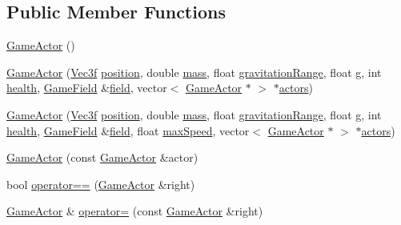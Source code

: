 \subsection*{Public Member Functions}
\begin{DoxyCompactItemize}
\item 
\hyperlink{class_game_actor_a15b04d8c6628c4d004573c3facfdb418}{Game\+Actor} ()
\item 
\hyperlink{class_game_actor_a8419e87ea13e15b82ed1564e477377ac}{Game\+Actor} (\hyperlink{class_vec3f}{Vec3f} \hyperlink{class_game_actor_aefed3c91bf32ad388d86657b3bb9ddfa}{position}, double \hyperlink{class_game_actor_a2111233f4f0216db4d172d5088ebeed4}{mass}, float \hyperlink{class_game_actor_a9c0ba51b08a3e617d9629c0ee8d309f2}{gravitation\+Range}, float \hyperlink{class_game_actor_a42ed4bef0d99cf053ff9a025c86d34d3}{g}, int \hyperlink{class_game_actor_a5d402a953140585fb7cc3f8a3a24a2a4}{health}, \hyperlink{class_game_field}{Game\+Field} \&\hyperlink{class_game_actor_a0224fbc502abd6b7579787aa234332d5}{field}, vector$<$ \hyperlink{class_game_actor}{Game\+Actor} $\ast$ $>$ $\ast$\hyperlink{class_game_actor_a2405618d895f5143b42ae9e94d20e693}{actors})
\item 
\hyperlink{class_game_actor_aad104099e725fa6224de80dbaf52f2b1}{Game\+Actor} (\hyperlink{class_vec3f}{Vec3f} \hyperlink{class_game_actor_aefed3c91bf32ad388d86657b3bb9ddfa}{position}, double \hyperlink{class_game_actor_a2111233f4f0216db4d172d5088ebeed4}{mass}, float \hyperlink{class_game_actor_a9c0ba51b08a3e617d9629c0ee8d309f2}{gravitation\+Range}, float \hyperlink{class_game_actor_a42ed4bef0d99cf053ff9a025c86d34d3}{g}, int \hyperlink{class_game_actor_a5d402a953140585fb7cc3f8a3a24a2a4}{health}, \hyperlink{class_game_field}{Game\+Field} \&\hyperlink{class_game_actor_a0224fbc502abd6b7579787aa234332d5}{field}, float \hyperlink{class_game_actor_a15b6abd006c52b21c569932f8b484eb0}{max\+Speed}, vector$<$ \hyperlink{class_game_actor}{Game\+Actor} $\ast$ $>$ $\ast$\hyperlink{class_game_actor_a2405618d895f5143b42ae9e94d20e693}{actors})
\item 
\hyperlink{class_game_actor_a305c6d8136305e8bfc72e2b64f44f549}{Game\+Actor} (const \hyperlink{class_game_actor}{Game\+Actor} \&actor)
\item 
bool \hyperlink{class_game_actor_a6052cc4a43b18dc72103a5a1abc521c2}{operator==} (\hyperlink{class_game_actor}{Game\+Actor} \&right)
\item 
\hyperlink{class_game_actor}{Game\+Actor} \& \hyperlink{class_game_actor_a806e4306d891e32c4e06b961cbf11702}{operator=} (const \hyperlink{class_game_actor}{Game\+Actor} \&right)

\end{DoxyCompactItemize}
